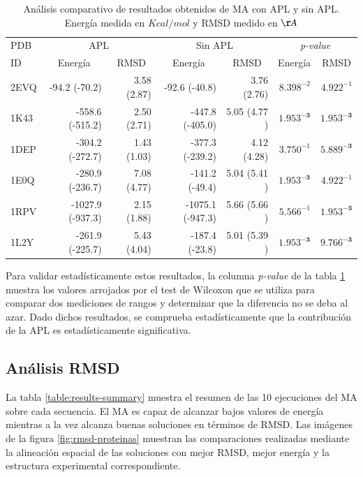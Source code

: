 \begin{table}[h]
	\centering
	\caption[Análisis comparativo de resultados de APL y Sin APL]{Análisis comparativo de resultados obtenidos de MA con APL y sin APL. Energía medida en $Kcal/mol$ y RMSD medido en $\AA$}
\begin{tabularx}{\textwidth}{|l|r|r|r|r|r|r|} \hline
{PDB} & \multicolumn{2}{c|}{APL} & \multicolumn{2}{c|}{Sin APL} & \multicolumn{2}{c|}{\textit{p-value}}\\ \cline{2-7}
 {ID} & \multicolumn{1}{c|}{Energía} & \multicolumn{1}{c|}{RMSD} & \multicolumn{1}{c|}{Energía} & \multicolumn{1}{c|}{RMSD} & \multicolumn{1}{c|}{Energía} & \multicolumn{1}{c|}{RMSD} \\ \hline
 {2EVQ} & -94.2 (-70.2) & 3.58 (2.87) & -92.6 (-40.8) & 3.76 (2.76) & $8.398^{-2}$ & $4.922^{-1}$   \\
 {1K43} & -558.6 (-515.2) & 2.50 (2.71) & -447.8 (-405.0) & 5.05 (4.77 ) & $\mathbf{1.953^{-3}}$ & $\mathbf{1.953^{-3}}$\\
 {1DEP} & -304.2 (-272.7) & 1.43 (1.03) & -377.3 (-239.2)  & 4.12 (4.28) & $3.750^{-1}$ & $\mathbf{5.889^{-3}}$\\
 {1E0Q} & -280.9 (-236.7) & 7.08 (4.77) & -141.2 (-49.4) & 5.04 (5.41 ) & $\mathbf{1.953^{-3}}$ & $4.922^{-1}$  \\
 {1RPV} & -1027.9 (-937.3) & 2.15 (1.88) & -1075.1 (-947.3) & 5.66 (5.66 ) & $5.566^{-1}$ & $\mathbf{1.953^{-3}}$  \\
 {1L2Y} & -261.9 (-225.7) & 5.43 (4.04) & -187.4 (-23.8) & 5.01 (5.39 ) & $\mathbf{1.953^{-3}}$ & $\mathbf{9.766^{-3}}$ \\ \hline
\end{tabularx}
\label{table:results-apl-noapl}
\end{table}

Para validar estadísticamente estos resultados, la columna \textit{p-value} de la tabla \ref{table:results-apl-noapl} muestra los valores arrojados por el test de Wilcoxon que se utiliza para comparar dos mediciones de rangos y determinar que la diferencia no se deba al azar. Dado dichos resultados, se comprueba estadísticamente que la contribución de la APL es estadísticamente significativa.


\subsection{Análisis RMSD}

La tabla \ref{table:results-summary} muestra el resumen de las 10 ejecuciones del MA sobre cada secuencia. El MA es capaz de alcanzar bajos valores de energía mientras a la vez alcanza buenas soluciones en términos de RMSD. Las imágenes de la figura \ref{fig:rmsd-proteinas} muestran las comparaciones realizadas mediante la alineación espacial de las soluciones con mejor RMSD, mejor energía y la estructura experimental correspondiente.

